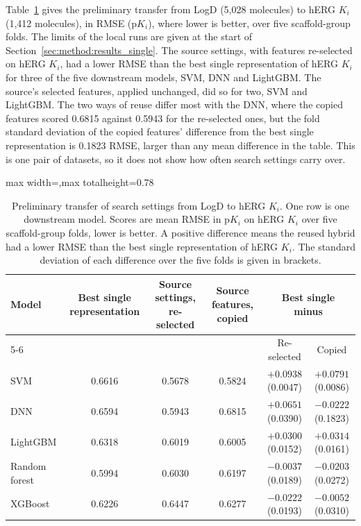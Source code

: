 
Table~\ref{tab:prelim_transfer} gives the preliminary transfer from LogD (5,028 molecules) to hERG $K_i$ (1,412 molecules), in RMSE (p$K_i$), where lower is better, over five scaffold-group folds. The limits of the local runs are given at the start of Section~\ref{sec:method:results_single}. The source settings, with features re-selected on hERG $K_i$, had a lower RMSE than the best single representation of hERG $K_i$ for three of the five downstream models, SVM, DNN and LightGBM. The source's selected features, applied unchanged, did so for two, SVM and LightGBM. The two ways of reuse differ most with the DNN, where the copied features scored 0.6815 against 0.5943 for the re-selected ones, but the fold standard deviation of the copied features' difference from the best single representation is 0.1823 RMSE, larger than any mean difference in the table. This is one pair of datasets, so it does not show how often search settings carry over.

\begin{table}[htbp]
\centering
\small
\begin{adjustbox}{max width=\textwidth,max totalheight=0.78\textheight}
\begin{tabular}{@{}lccccc@{}}
\toprule
Model & Best single representation & Source settings, re-selected & Source features, copied & \multicolumn{2}{c}{Best single minus} \\
\cmidrule(l){5-6}
 & & & & Re-selected & Copied \\
\midrule
SVM & 0.6616 & 0.5678 & 0.5824 & $+0.0938$ (0.0047) & $+0.0791$ (0.0086) \\
DNN & 0.6594 & 0.5943 & 0.6815 & $+0.0651$ (0.0390) & $-0.0222$ (0.1823) \\
LightGBM & 0.6318 & 0.6019 & 0.6005 & $+0.0300$ (0.0152) & $+0.0314$ (0.0161) \\
Random forest & 0.5994 & 0.6030 & 0.6197 & $-0.0037$ (0.0189) & $-0.0203$ (0.0272) \\
XGBoost & 0.6226 & 0.6447 & 0.6277 & $-0.0222$ (0.0193) & $-0.0052$ (0.0310) \\
\bottomrule
\end{tabular}
\end{adjustbox}
\caption[Preliminary: reusing search settings from LogD on hERG $K_i$.]{Preliminary transfer of search settings from LogD to hERG $K_i$. One row is one downstream model. Scores are mean RMSE in p$K_i$ on hERG $K_i$ over five scaffold-group folds, lower is better. A positive difference means the reused hybrid had a lower RMSE than the best single representation of hERG $K_i$. The standard deviation of each difference over the five folds is given in brackets.}
\label{tab:prelim_transfer}
\end{table}

